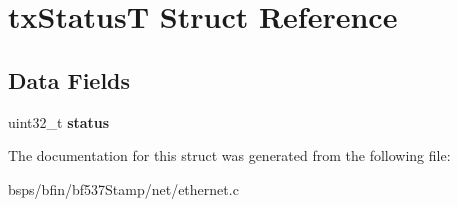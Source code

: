 \hypertarget{structtxStatusT}{}\section{tx\+StatusT Struct Reference}
\label{structtxStatusT}
\subsection*{Data Fields}
\begin{DoxyCompactItemize}
\item 
\mbox{\label{structtxStatusT_afdef539132ac034bf3e7adbfc4cb92fe}} 
uint32\+\_\+t {\bfseries status}
\end{DoxyCompactItemize}


The documentation for this struct was generated from the following file\+:\begin{DoxyCompactItemize}
\item 
bsps/bfin/bf537\+Stamp/net/ethernet.\+c\end{DoxyCompactItemize}
